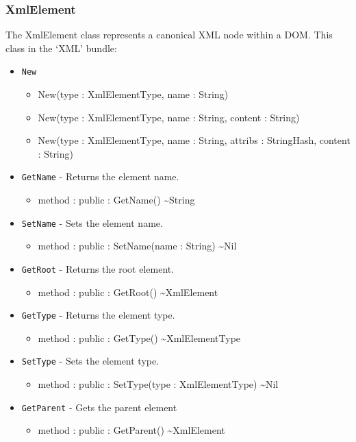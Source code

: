 \documentclass[11pt]{article}
\begin{document}
\subsubsection{XmlElement}
The XmlElement class represents a canonical XML node within a
DOM. This class in the `XML' bundle:
\begin{itemize}
\item \texttt{New}
  \begin{itemize}
  \item New(type : XmlElementType, name : String)
  \item New(type : XmlElementType, name : String, content : String)
  \item New(type : XmlElementType, name : String, attribs :
    StringHash, content : String)
  \end{itemize}
\item \texttt{GetName} - Returns the element name.
  \begin{itemize}
  \item method : public : GetName() \textasciitilde String
  \end{itemize}
\item \texttt{SetName} - Sets the element name.
  \begin{itemize}
  \item method : public : SetName(name : String) \textasciitilde Nil
  \end{itemize}
\item \texttt{GetRoot} - Returns the root element.
  \begin{itemize}
  \item method : public : GetRoot() \textasciitilde XmlElement
  \end{itemize}
\item \texttt{GetType} - Returns the element type.
  \begin{itemize}
  \item method : public : GetType() \textasciitilde XmlElementType
  \end{itemize}
\item \texttt{SetType} - Sets the element type.
  \begin{itemize}
  \item method : public : SetType(type : XmlElementType)
    \textasciitilde Nil
  \end{itemize}
\item \texttt{GetParent} - Gets the parent element
  \begin{itemize}
  \item method : public : GetParent() \textasciitilde XmlElement

\end{itemize}
\end{itemize}
\end{document}
